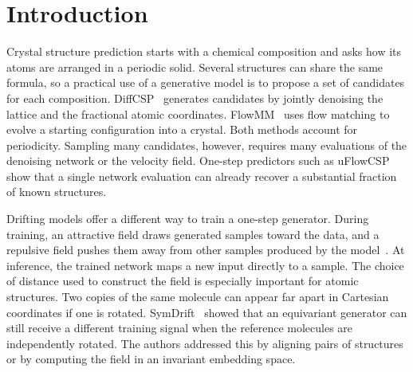 \begin{abstract}
Predicting a crystal structure from its composition requires finding both the lattice and the positions of the atoms within it. Diffusion and flow models can predict both, but they typically refine each candidate over many sampling steps. We introduce CrytalDrift, a model that generates a periodic structure in a single network evaluation. During training, a drifting field draws generated crystals toward reference structures and pushes them away from other generated samples. We build this field using periodic descriptors of atomic environments and show that its value is unchanged when any crystal is rotated, its origin is shifted, or its lattice is written in an equivalent basis. We use the field to train generators that update individual atomic sites or move symmetry-related sites together within occupied Wyckoff orbits. On MP-20, one-step sampling recovered more reference structures than a compact multistep flow when both were given the same short time per composition.
\end{abstract}

\section{Introduction}
Crystal structure prediction starts with a chemical composition and asks how its atoms are arranged in a periodic solid. Several structures can share the same formula, so a practical use of a generative model is to propose a set of candidates for each composition. DiffCSP~\cite{diffcsp} generates candidates by jointly denoising the lattice and the fractional atomic coordinates. FlowMM~\cite{flowmm} uses flow matching to evolve a starting configuration into a crystal. Both methods account for periodicity. Sampling many candidates, however, requires many evaluations of the denoising network or the velocity field. One-step predictors such as uFlowCSP~\cite{uflow} show that a single network evaluation can already recover a substantial fraction of known structures.

Drifting models offer a different way to train a one-step generator. During training, an attractive field draws generated samples toward the data, and a repulsive field pushes them away from other samples produced by the model~\cite{deng}. At inference, the trained network maps a new input directly to a sample. The choice of distance used to construct the field is especially important for atomic structures. Two copies of the same molecule can appear far apart in Cartesian coordinates if one is rotated. SymDrift~\cite{symdrift} showed that an equivariant generator can still receive a different training signal when the reference molecules are independently rotated. The authors addressed this by aligning pairs of structures or by computing the field in an invariant embedding space.

